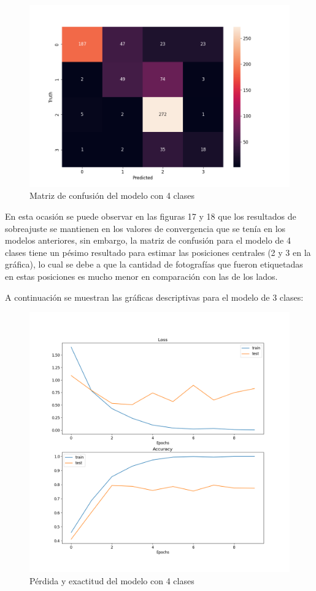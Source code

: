 \begin{figure}[H]
	\centering
	\includegraphics[scale=0.75]{figures/CM4.png}
	\caption{Matriz de confusión del modelo con 4 clases}
	\label{fig:img18}
\end{figure}

En esta ocasión se puede observar en las figuras 17 y 18 que los resultados de sobreajuste se mantienen en los valores de convergencia que se tenía en los modelos anteriores, sin embargo, la matriz de confusión para el modelo de 4 clases tiene un pésimo resultado para estimar las posiciones centrales (2 y 3 en la gráfica), lo cual se debe a que la cantidad de fotografías que fueron etiquetadas en estas posiciones es mucho menor en comparación con las de los lados.\par

A continuación se muestran las gráficas descriptivas para el modelo de 3 clases:

\begin{figure}[H]
	\centering
	\includegraphics[scale=0.65]{figures/LA5.png}
	\caption{Pérdida y exactitud del modelo con 4 clases}
	\label{fig:img19}
\end{figure}

